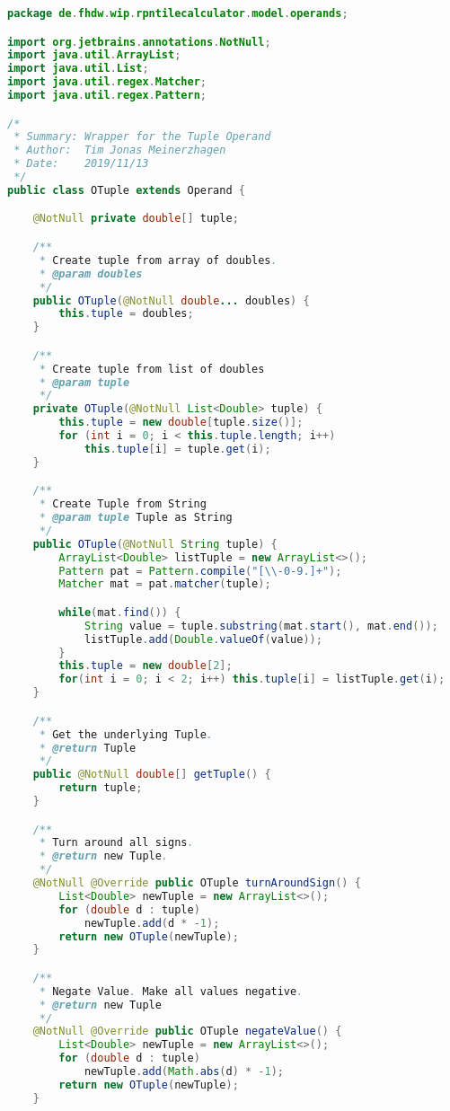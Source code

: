 \begin{lstlisting}[caption=OTuple (Meinerzhagen),label=list:OTuple,language=Java]
package de.fhdw.wip.rpntilecalculator.model.operands;

import org.jetbrains.annotations.NotNull;
import java.util.ArrayList;
import java.util.List;
import java.util.regex.Matcher;
import java.util.regex.Pattern;

/*
 * Summary: Wrapper for the Tuple Operand
 * Author:  Tim Jonas Meinerzhagen
 * Date:    2019/11/13
 */
public class OTuple extends Operand {

    @NotNull private double[] tuple;

    /**
     * Create tuple from array of doubles.
     * @param doubles
     */
    public OTuple(@NotNull double... doubles) {
        this.tuple = doubles;
    }

    /**
     * Create tuple from list of doubles
     * @param tuple
     */
    private OTuple(@NotNull List<Double> tuple) {
        this.tuple = new double[tuple.size()];
        for (int i = 0; i < this.tuple.length; i++)
            this.tuple[i] = tuple.get(i);
    }

    /**
     * Create Tuple from String
     * @param tuple Tuple as String
     */
    public OTuple(@NotNull String tuple) {
        ArrayList<Double> listTuple = new ArrayList<>();
        Pattern pat = Pattern.compile("[\\-0-9.]+");
        Matcher mat = pat.matcher(tuple);

        while(mat.find()) {
            String value = tuple.substring(mat.start(), mat.end());
            listTuple.add(Double.valueOf(value));
        }
        this.tuple = new double[2];
        for(int i = 0; i < 2; i++) this.tuple[i] = listTuple.get(i);
    }

    /**
     * Get the underlying Tuple.
     * @return Tuple
     */
    public @NotNull double[] getTuple() {
        return tuple;
    }

    /**
     * Turn around all signs.
     * @return new Tuple.
     */
    @NotNull @Override public OTuple turnAroundSign() {
        List<Double> newTuple = new ArrayList<>();
        for (double d : tuple)
            newTuple.add(d * -1);
        return new OTuple(newTuple);
    }

    /**
     * Negate Value. Make all values negative.
     * @return new Tuple
     */
    @NotNull @Override public OTuple negateValue() {
        List<Double> newTuple = new ArrayList<>();
        for (double d : tuple)
            newTuple.add(Math.abs(d) * -1);
        return new OTuple(newTuple);
    }


\end{lstlisting}
